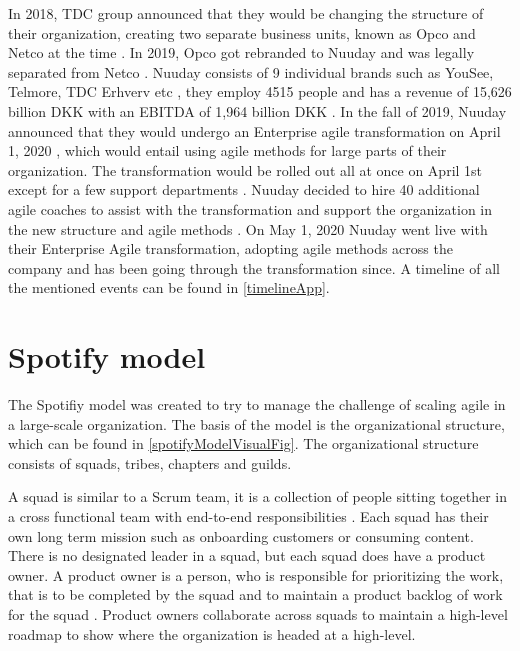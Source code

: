 \documentclass[11pt,a4paper]{report}
\begin{document}
In 2018, TDC group announced that they would be changing the structure of their organization, creating two separate business units, known as Opco and Netco at the time \cite{tdcSplitAnnouncement}. In 2019, Opco got rebranded to Nuuday and was legally separated from Netco \cite{tdcNuuday}. Nuuday consists of 9 individual brands such as YouSee, Telmore, TDC Erhverv etc \cite{nuuday}, they employ 4515 people \cite{tdcGroupAnnualReport} and has a revenue of 15,626 billion DKK with an EBITDA of 1,964 billion DKK \cite{tdcGroupAnnualReport}. In the fall of 2019, Nuuday announced that they would undergo an Enterprise agile transformation on April 1, 2020 \cite{acTeleEnterpriseAgileNuuday}, which would entail using agile methods for large parts of their organization. The transformation would be rolled out all at once on April 1st except for a few support departments \cite{HenrikNuudayPresentation}. Nuuday decided to hire 40 additional agile coaches to assist with the transformation and support the organization in the new structure and agile methods \cite{HenrikNuudayPresentation}. On May 1, 2020 Nuuday went live with their Enterprise Agile transformation, adopting agile methods across the company and has been going through the transformation since.
A timeline of all the mentioned events can be found in \autoref{timelineApp}.

\section{Spotify model}
\label{spotifyModelBackgroundInfo}
The Spotifiy model was created to try to manage the challenge of scaling agile in a large-scale organization. The basis of the model is the organizational structure, which can be found in \autoref{spotifyModelVisualFig}. The organizational structure consists of squads, tribes, chapters and guilds. 

A squad is similar to a Scrum team, it is a collection of people sitting together in a cross functional team with end-to-end responsibilities \cite{spotifyMethod}. Each squad has their own long term mission such as onboarding customers or consuming content. There is no designated leader in a squad, but each squad does have a product owner. A product owner is a person, who is responsible for prioritizing the work, that is to be completed by the squad and to maintain a product backlog of work for the squad \cite{spotifyMethod}. Product owners collaborate across squads to maintain a high-level roadmap to show where the organization is headed at a high-level.
\end{document}
